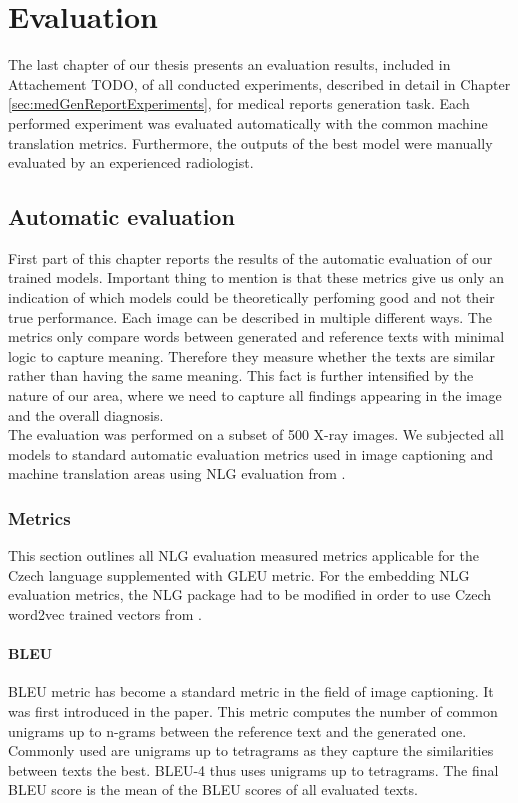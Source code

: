 \chapter{Evaluation}
The last chapter of our thesis presents an evaluation results, included in Attachement TODO, of all conducted experiments, described in detail in Chapter \ref{sec:medGenReportExperiments}, for medical reports generation task. Each performed experiment was evaluated automatically with the common machine translation metrics. Furthermore, the outputs of the best model were manually evaluated by an experienced radiologist.

\section{Automatic evaluation}
First part of this chapter reports the results of the automatic evaluation of our trained models. Important thing to mention is that these metrics give us only an indication of which models could be theoretically perfoming good and not their true performance. Each image can be described in multiple different ways. The metrics only compare words between generated and reference texts with minimal logic to capture meaning. Therefore they measure whether the texts are similar rather than having the same meaning. This fact is further intensified by the nature of our area, where we need to capture all findings appearing in the image and the overall diagnosis. \\

The evaluation was performed on a subset of 500 X-ray images. We subjected all models to standard automatic evaluation metrics used in image captioning and machine translation areas using NLG evaluation from \citet{sharma2017nlgeval}.

\subsection{Metrics}
This section outlines all NLG evaluation measured metrics applicable for the Czech language supplemented with GLEU metric. For the embedding NLG evaluation metrics, the NLG package had to be modified in order to use Czech word2vec trained vectors from \citet{grave2018learning}.

\subsubsection*{BLEU}
BLEU metric has become a standard metric in the field of image captioning. It was first introduced in the \citet{papineni2002bleu} paper. This metric computes the number of common unigrams up to n-grams between the reference text and the generated one. Commonly used are unigrams up to tetragrams as they capture the similarities between texts the best. BLEU-4 thus uses unigrams up to tetragrams. The final BLEU score is the mean of the BLEU scores of all evaluated texts.

